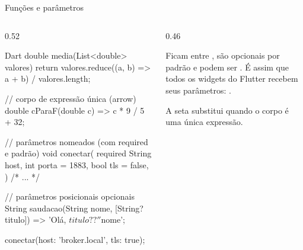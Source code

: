 \documentclass[aspectratio=169,10pt]{beamer}
\begin{document}
\begin{frame}[fragile]{Funções e parâmetros}
  \begin{columns}[T]
    \begin{column}{0.52\textwidth}
\begin{codigo}[title=funcoes.dart]{Dart}
double media(List<double> valores) {
  return valores.reduce((a, b) => a + b) / valores.length;
}

// corpo de expressão única (arrow)
double cParaF(double c) => c * 9 / 5 + 32;

// parâmetros nomeados (com required e padrão)
void conectar({
  required String host,
  int porta = 1883,
  bool tls = false,
}) { /* ... */ }

// parâmetros posicionais opcionais
String saudacao(String nome, [String? titulo]) =>
    'Olá, ${titulo ?? ''} $nome';

conectar(host: 'broker.local', tls: true);
\end{codigo}
    \end{column}
    \begin{column}{0.46\textwidth}
      \begin{conceito}
        Ficam entre \cod{\{ \}}, são opcionais por padrão e podem ser . É assim que todos os widgets do Flutter recebem seus parâmetros: .
      \end{conceito}
      \begin{dica}
        A seta \cod{=>} substitui  quando o corpo é uma única expressão.
      \end{dica}
    \end{column}
  \end{columns}
\end{frame}
\end{document}
